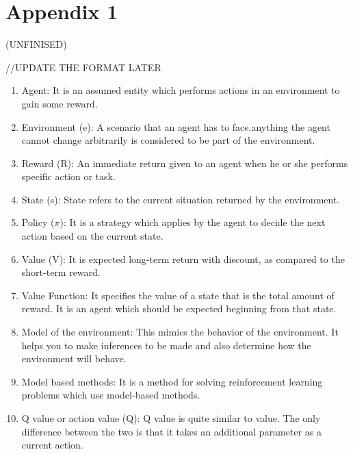 \chapter{Appendix 1}(UNFINISED)

//UPDATE THE FORMAT LATER 
\begin{enumerate}

    \item{ Agent: It is an assumed entity which performs actions in an environment to gain some reward.}
    \item{Environment (e): A scenario that an agent has to face.anything the agent  cannot change arbitrarily is considered to be part of the environment.} 
    \item{Reward (R): An immediate return given to an agent when he or she performs specific action or task.}
    \item{ State (s): State refers to the current situation returned by the environment.}
    \item{Policy ($\pi$): It is a strategy which applies by the agent to decide the next action based on the current state.}
    \item{ Value (V): It is expected long-term return with discount, as compared to the short-term reward.}
    \item{ Value Function: It	specifies the value of a state that is the total amount of reward. It is an agent which should be expected beginning from that state.}
    \item{ Model of the environment: This mimics the behavior of the environment. It helps you to make inferences to be made and also determine how the environment will behave.}
    \item{ Model based methods: It is a method for solving reinforcement learning problems which use model-based methods.}
    \item{ Q value or action value (Q): Q value is quite similar to value. The only difference between the two is that it takes an additional parameter as a current action.}
\end{enumerate}

